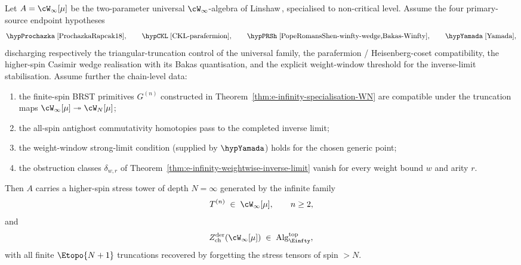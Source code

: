 \begin{theorem}
\label{thm:e-infinity-specialisation-Winfty}
\label{conj:e-infinity-specialisation-Winfty}%
Let $A = \cW_\infty[\mu]$ be the two-parameter universal
$\cW_\infty$-algebra of Linshaw\,\textup{\cite{Linshaw-Winfty}},
specialised to non-critical level. Assume the four primary-source
endpoint hypotheses
\[
 \hypProchazka\;\text{\cite{ProchazkaRapcak18}},\qquad
 \hypCKL\;\text{\cite{CKL-parafermion}},\qquad
 \hypPRSh\;\text{\cite{PopeRomansShen-winfty-wedge,Bakas-Winfty}},\qquad
 \hypYamada\;\text{\cite{Yamada}},
\]
discharging respectively the triangular-truncation control of the
universal family, the parafermion / Heisenberg-coset compatibility,
the higher-spin Casimir wedge realisation with its Bakas quantisation,
and the explicit weight-window threshold for the inverse-limit
stabilisation. Assume further the chain-level data:
\begin{enumerate}
 \item the finite-spin BRST primitives \(G^{(n)}\) constructed in
 Theorem~\ref{thm:e-infinity-specialisation-WN} are compatible under
 the truncation maps
 \(\cW_\infty[\mu]\twoheadrightarrow\cW_N[\mu]\);
 \item the all-spin antighost commutativity homotopies pass to the
 completed inverse limit;
 \item the weight-window strong-limit condition (supplied by
 $\hypYamada$) holds for the chosen generic point;
 \item the obstruction classes
 \(\delta_{w,r}\) of
 Theorem~\ref{thm:e-infinity-weightwise-inverse-limit} vanish for every
 weight bound \(w\) and arity \(r\).
\end{enumerate}
Then $A$ carries a higher-spin
stress tower of depth $N = \infty$ generated by the infinite family
\begin{equation}\label{eq:winfty-stress-tower}
T^{(n)} \;\in\; \cW_\infty[\mu],\qquad n \ge 2,
\end{equation}
and
\begin{equation}\label{eq:winfty-Einfty-top}
Z^{\mathrm{der}}_{\mathrm{ch}}(\cW_\infty[\mu]) \;\in\;
\mathrm{Alg}_{\Einfty}^{\mathrm{top}},
\end{equation}
with all finite $\Etopo{N+1}$ truncations recovered by forgetting the
stress tensors of spin $>N$.
\end{theorem}

